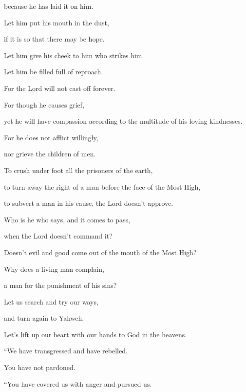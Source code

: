{\par }{\QB because he has laid it on him.
\par }{\Q {}Let him put his mouth in the dust,
\par }{\QB if it is so that there may be hope.
\par }{\Q {}Let him give his cheek to him who strikes him.
\par }{\QB Let him be filled full of reproach.
\par }{\BB \par }{\Q {}For the Lord will not cast off forever.
\par }{\QB {}For though he causes grief,
\par }{\QB yet he will have compassion according to the multitude of his loving kindnesses.
\par }{\Q {}For he does not afflict willingly,
\par }{\QB nor grieve the children of men.
\par }{\BB \par }{\Q {}To crush under foot all the prisoners of the earth,
\par }{\QB {}to turn away the right of a man before the face of the Most High,
\par }{\QB {}to subvert a man in his cause, the Lord doesn’t approve.
\par }{\BB \par }{\Q {}Who is he who says, and it comes to pass,
\par }{\QB when the Lord doesn’t command it?
\par }{\Q {}Doesn’t evil and good come out of the mouth of the Most High?
\par }{\QB {}Why does a living man complain,
\par }{\QB a man for the punishment of his sins?
\par }{\BB \par }{\Q {}Let us search and try our ways,
\par }{\QB and turn again to Yahweh.
\par }{\Q {}Let’s lift up our heart with our hands to God in the heavens.
\par }{\QB {}“We have transgressed and have rebelled.
\par }{\QB You have not pardoned.
\par }{\BB \par }{\Q {}“You have covered us with anger and pursued us.
}
